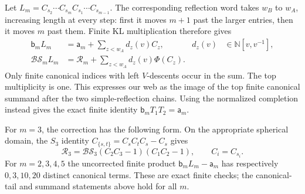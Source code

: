 Let $L_m=C_{s_2}\cdots C_{s_m}C_{s_1}\cdots C_{s_{m-1}}$.
The corresponding reflection word takes $w_B$ to $w_A$, increasing
length at every step: first it moves $m+1$ past the larger entries,
then it moves $m$ past them. Finite KL multiplication therefore gives
\begin{align*}
 \mathsf b_mL_m
 &=\mathsf a_m+\sum_{z<w_A}d_z(v)C_z,
 &d_z(v)&\in\mathbb N[v,v^{-1}],\\
 \mathcal{BS}_mL_m
 &=\mathcal R_m+\sum_{z<w_A}d_z(v)\Phi(C_z).
\end{align*}
Only finite canonical indices with left $V$-descents occur in the sum.
The top multiplicity is one. This expresses our web as the image of
the top finite canonical summand after the two simple-reflection
chains. Using the normalized completion instead gives the exact
finite identity $\mathsf b_mT_1T_2=\mathsf a_m$.

For $m=3$, the correction has the following form. On the appropriate
spherical domain, the $S_3$ identity
$C_{\{s,t\}}=C_sC_tC_s-C_s$ gives
\[
 \mathcal R_3=\mathcal{BS}_3(C_2C_3-1)(C_1C_2-1),
 \qquad C_i=C_{s_i}.
\]
For $m=2,3,4,5$ the uncorrected finite product
$\mathsf b_mL_m-\mathsf a_m$ has respectively $0,3,10,20$
distinct canonical terms. These are exact finite checks; the
canonical-tail and summand statements above hold for all $m$.
